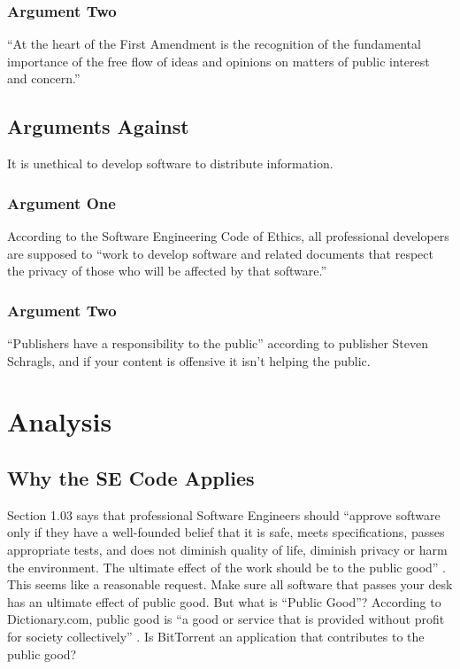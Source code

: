 \documentclass[11pt]{article}
\begin{document}
\subsubsection{Argument Two}
``At the heart of the First Amendment is the recognition of the fundamental importance of the free flow of ideas and opinions on matters of public interest and concern.'' \cite[51]{1988hustler}

\subsection{Arguments Against}
It is unethical to develop software to distribute information.

\subsubsection{Argument One }
According to the Software Engineering Code of Ethics, all professional developers are supposed to ``work to develop software and related documents that respect the privacy of those who will be affected by that software.'' \cite[3.12]{secode}

\subsubsection{Argument Two}
``Publishers have a responsibility to the public'' according to publisher Steven Schragls, and if your content is offensive it isn't helping the public. \cite[46]{hawker}

\section{Analysis}

\subsection{Why the SE Code Applies}

Section 1.03 says that professional Software Engineers should ``approve software only if they have a well-founded belief that it is safe, meets specifications, passes appropriate tests, and does not diminish quality of life, diminish privacy or harm the environment. The ultimate effect of the work should be to the public good'' \cite[1.03]{secode}. This seems like a reasonable request. Make sure all software that passes your desk has an ultimate effect of public good. But what is ``Public Good''? According to Dictionary.com, public good is ``a good or service that is provided without profit for society collectively'' \cite{pubgooddef}. Is BitTorrent an application that contributes to the public good?
\end{document}
